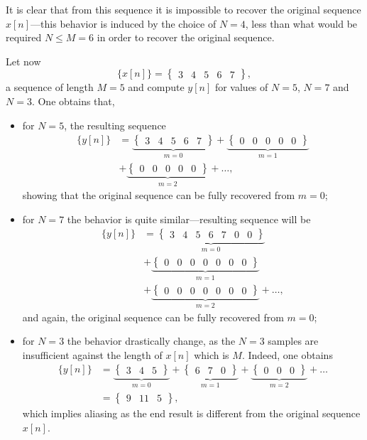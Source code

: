 \documentclass[\documentfontsize, twocolumn]{\classname}
\begin{document}
It is clear that from this sequence it is impossible to recover the original sequence $x[n]$---this behavior is induced by the choice of $N=4$, less than what would be required $N\leq M = 6$ in order to recover the original sequence.

Let now
\[
    \{x[n]\} = \begin{Bmatrix} 3 & 4&  5&  6&  7\end{Bmatrix},
\]
a sequence of length $M=5$ and compute $y[n]$ for values of $N=5$, $N=7$ and $N=3$. One obtains that,
\begin{itemize}
    \item for $N=5$, the resulting sequence \begin{align*}\{y[n]\} &= \underbrace{\begin{Bmatrix} 3 & 4 & 5 & 6 & 7\end{Bmatrix}}_{m = 0} + \underbrace{\begin{Bmatrix} 0 & 0 & 0 & 0 & 0 \end{Bmatrix}}_{m=1}\\ &+ \underbrace{\begin{Bmatrix} 0 & 0 & 0 & 0 & 0 \end{Bmatrix}}_{m=2} +\dots,\end{align*} showing that the original sequence can be fully recovered from $m=0$;
    \item for $N=7$ the behavior is quite similar---resulting sequence will be \begin{align*}\{y[n]\} &= \underbrace{\begin{Bmatrix} 3 & 4 & 5 & 6 & 7 & 0 & 0\end{Bmatrix}}_{m = 0}\\ &+ \underbrace{\begin{Bmatrix} 0 & 0 & 0 & 0 & 0 & 0 & 0 \end{Bmatrix}}_{m=1}\\ &+ \underbrace{\begin{Bmatrix} 0 & 0 & 0 & 0 & 0 & 0 & 0 \end{Bmatrix}}_{m=2} +\dots,\end{align*} and again, the original sequence can be fully recovered from $m=0$;
    \item for $N=3$ the behavior drastically change, as the $N=3$ samples are insufficient against the length of $x[n]$ which is $M$. Indeed, one obtains \begin{align*} \{y[n]\} &= \underbrace{\begin{Bmatrix} 3 & 4 & 5\end{Bmatrix}}_{m=0} + \underbrace{\begin{Bmatrix} 6 & 7 & 0\end{Bmatrix}}_{m=1} + \underbrace{\begin{Bmatrix}0 & 0 & 0\end{Bmatrix}}_{m=2} + \dots\\ &= \begin{Bmatrix} 9 & 11 & 5 \end{Bmatrix},\end{align*} which implies aliasing as the end result is different from the original sequence $x[n]$.
\end{itemize}
\end{document}
